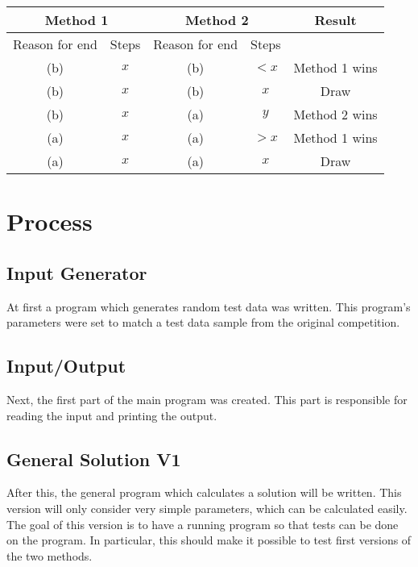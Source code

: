 \documentclass[10pt]{report}
\begin{document}
\begin{tabular}{|c|c|c|c|c|}
    \hline
    \multicolumn{2}{|c|}{Method 1} & \multicolumn{2}{|c|}{Method 2} & \multirow{2}{*}{Result}                         \\ \hline
    Reason for end                 & Steps                          & Reason for end          & Steps &               \\ \hline
    (b)                            & $x$                            & (b)                     & $< x$ & Method 1 wins \\ \hline
    (b)                            & $x$                            & (b)                     & $x$   & Draw          \\ \hline
    (b)                            & $x$                            & (a)                     & $y$   & Method 2 wins \\ \hline
    (a)                            & $x$                            & (a)                     & $>x$  & Method 1 wins \\ \hline
    (a)                            & $x$                            & (a)                     & $x$   & Draw          \\ \hline
\end{tabular}


\chapter{Process}
\section{Input Generator}
At first a program which generates random test data was written. This program’s parameters were set to match a test data sample from the original competition.

\section{Input/Output}
Next, the first part of the main program was created. This part is responsible for reading the input and printing the output.

\section{General Solution V1}
After this, the general program which calculates a solution will be written. This version will only consider very simple parameters, which can be calculated easily. The goal of this version is to have a running program so that tests can be done on the program. In particular, this should make it possible to test first versions of the two methods.
\end{document}
